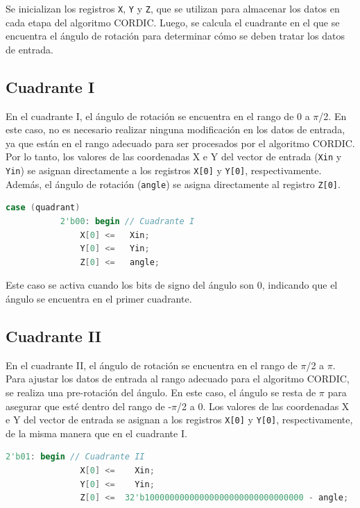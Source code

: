 \documentclass[12pt,a4paper, twoside]{article} %
\begin{document}
Se inicializan los registros \texttt{X}, \texttt{Y} y \texttt{Z}, que se utilizan para almacenar los datos en cada etapa del algoritmo CORDIC. Luego, se calcula el cuadrante en el que se encuentra el ángulo de rotación para determinar cómo se deben tratar los datos de entrada.

\subsection{Cuadrante I}

En el cuadrante I, el ángulo de rotación se encuentra en el rango de 0 a $\pi$/2. En este caso, no es necesario realizar ninguna modificación en los datos de entrada, ya que están en el rango adecuado para ser procesados por el algoritmo CORDIC. Por lo tanto, los valores de las coordenadas X e Y del vector de entrada (\texttt{Xin} y \texttt{Yin}) se asignan directamente a los registros \texttt{X[0]} y \texttt{Y[0]}, respectivamente. Además, el ángulo de rotación (\texttt{angle}) se asigna directamente al registro \texttt{Z[0]}.

\begin{lstlisting}[language=Verilog]
       case (quadrant)
           2'b00: begin // Cuadrante I
               X[0] <=   Xin;
               Y[0] <=   Yin;
               Z[0] <=   angle;
\end{lstlisting}

Este caso se activa cuando los bits de signo del ángulo son 0, indicando que el ángulo se encuentra en el primer cuadrante.

\subsection{Cuadrante II}

En el cuadrante II, el ángulo de rotación se encuentra en el rango de $\pi$/2 a $\pi$. Para ajustar los datos de entrada al rango adecuado para el algoritmo CORDIC, se realiza una pre-rotación del ángulo. En este caso, el ángulo se resta de $\pi$ para asegurar que esté dentro del rango de -$\pi$/2 a 0. Los valores de las coordenadas X e Y del vector de entrada se asignan a los registros \texttt{X[0]} y \texttt{Y[0]}, respectivamente, de la misma manera que en el cuadrante I.

\begin{lstlisting}[language=Verilog]
       2'b01: begin // Cuadrante II
               X[0] <=    Xin;
               Y[0] <=    Yin;
               Z[0] <=  32'b10000000000000000000000000000000 - angle;                  
\end{lstlisting}
\end{document}

